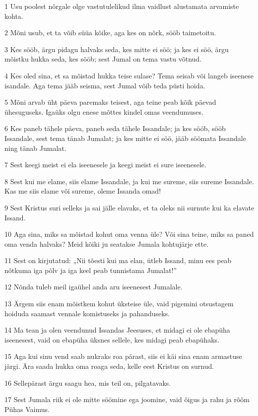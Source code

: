 \par 1 Usu poolest nõrgale olge vastutulelikud ilma vaidlust alustamata arvamiste kohta.
\par 2 Mõni usub, et ta võib süüa kõike, aga kes on nõrk, sööb taimetoitu.
\par 3 Kes sööb, ärgu pidagu halvaks seda, kes mitte ei söö; ja kes ei söö, ärgu mõistku hukka seda, kes sööb; sest Jumal on tema vastu võtnud.
\par 4 Kes oled sina, et sa mõistad hukka teise sulase? Tema seisab või langeb iseenese isandale. Aga tema jääb seisma, sest Jumal võib teda püsti hoida.
\par 5 Mõni arvab üht päeva paremaks teisest, aga teine peab kõik päevad ühesuguseks. Igaüks olgu enese mõttes kindel omas veendumuses.
\par 6 Kes paneb tähele päeva, paneb seda tähele Issandale; ja kes sööb, sööb Issandale, sest tema tänab Jumalat; ja kes mitte ei söö, jääb söömata Issandale ning tänab Jumalat.
\par 7 Sest keegi meist ei ela iseenesele ja keegi meist ei sure iseenesele.
\par 8 Sest kui me elame, siis elame Issandale, ja kui me sureme, siis sureme Issandale. Kas me siis elame või sureme, oleme Issanda omad!
\par 9 Sest Kristus suri selleks ja sai jälle elavaks, et ta oleks nii surnute kui ka elavate Issand.
\par 10 Aga sina, miks sa mõistad kohut oma venna üle? Või sina teine, miks sa paned oma venda halvaks? Meid kõiki ju seatakse Jumala kohtujärje ette.
\par 11 Sest on kirjutatud: „Nii tõesti kui ma elan, ütleb Issand, minu ees peab nõtkuma iga põlv ja iga keel peab tunnistama Jumalat!”
\par 12 Nõnda tuleb meil igaühel anda aru iseenesest Jumalale.
\par 13 Ärgem siis enam mõistkem kohut üksteise üle, vaid pigemini otsustagem hoiduda saamast vennale komistuseks ja pahanduseks.
\par 14 Ma tean ja olen veendunud Issandas Jeesuses, et midagi ei ole ebapüha iseenesest, vaid on ebapüha üksnes sellele, kes midagi peab ebapühaks.
\par 15 Aga kui sinu vend saab nukraks roa pärast, siis ei käi sina enam armastuse järgi. Ära saada hukka oma roaga seda, kelle eest Kristus on surnud.
\par 16 Sellepärast ärgu saagu hea, mis teil on, pilgatavaks.
\par 17 Sest Jumala riik ei ole mitte söömine ega joomine, vaid õigus ja rahu ja rõõm Pühas Vaimus.
